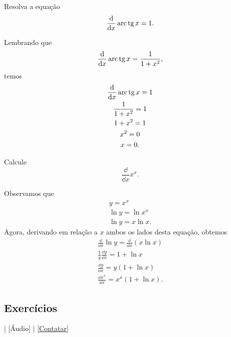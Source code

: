 \begin{exeresol}
  Resolva a equação
  \begin{equation}
    \frac{\mathrm{d}}{\mathrm{d} x}\operatorname{arc}\operatorname{tg} x = 1.
  \end{equation}
\end{exeresol}
\begin{resol}
  Lembrando que
  \begin{equation}
    \frac{\mathrm{d}}{\mathrm{d} x}\operatorname{arc}\operatorname{tg} x = \frac{1}{1+x^2},
  \end{equation}
  temos
  \begin{gather}
    \frac{\mathrm{d}}{\mathrm{d} x}\operatorname{arc}\operatorname{tg} x = 1 \\
    \frac{1}{1+x^2}=1 \\
    1+x^2 = 1 \\
    x^2 = 0 \\
    x = 0.
  \end{gather}
\end{resol}

\begin{exeresol}
  Calcule
  \begin{equation}
    \frac{\dd}{\dd x}x^x.
  \end{equation}
\end{exeresol}
\begin{resol}
  Observamos que
  \begin{gather}
    y = x^x \\
    \ln y = \ln x^x \\
    \ln y = x\ln x.
  \end{gather}
  Agora, derivando em relação a $x$ ambos os lados desta equação, obtemos
  \begin{gather}
    \frac{\dd}{\dd x}\ln y = \frac{\dd}{\dd x}\left(x\ln x\right) \\
    \frac{1}{y}\frac{\dd y}{\dd x} = 1 + \ln x \\
    \frac{\dd y}{\dd x} = y(1 + \ln x) \\
    \frac{\dd x^x}{\dd x} = x^x(1 + \ln x).
  \end{gather}
\end{resol}

\subsection*{Exercícios}

\begin{flushright}
  [Vídeo] | [Áudio] | \href{https://phkonzen.github.io/notas/contato.html}{[Contatar]}
\end{flushright}

